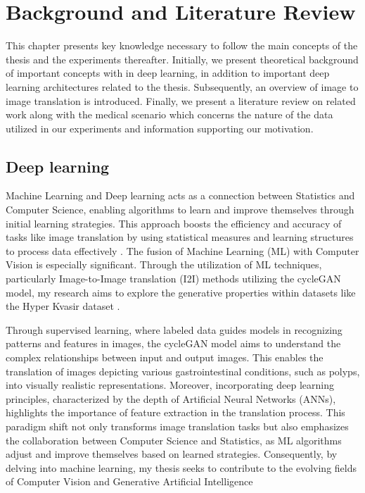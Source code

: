 \documentclass[UKenglish,12pt]{master-style}
\begin{document}
\chapter{Background and Literature Review}

This chapter presents key knowledge necessary to follow the main concepts of the thesis and the experiments thereafter. Initially, we present theoretical background of important concepts with in deep learning, in addition to important deep learning architectures related to the thesis. Subsequently, an overview of image to image translation is introduced. Finally, we present a literature review on related work along with the medical scenario which concerns the nature of the data utilized in our experiments and information supporting our motivation. 

\section{Deep learning}

Machine Learning and Deep learning acts as a connection between Statistics and Computer Science, enabling algorithms to learn and improve themselves through initial learning strategies. This approach boosts the efficiency and accuracy of tasks like image translation by using statistical measures and learning structures to process data effectively \cite{app14020496}. The fusion of Machine Learning (ML) with Computer Vision is especially significant. Through the utilization of ML techniques, particularly Image-to-Image translation (I2I) methods utilizing the cycleGAN model, my research aims to explore the generative properties within datasets like the Hyper Kvasir dataset  \cite{I2I}.

Through supervised learning, where labeled data guides models in recognizing patterns and features in images, the cycleGAN model aims to understand the complex relationships between input and output images. This enables the translation of images depicting various gastrointestinal conditions, such as polyps, into visually realistic representations. Moreover, incorporating deep learning principles, characterized by the depth of Artificial Neural Networks (ANNs), highlights the importance of feature extraction in the translation process. This paradigm shift not only transforms image translation tasks but also emphasizes the collaboration between Computer Science and Statistics, as ML algorithms adjust and improve themselves based on learned strategies. Consequently, by delving into machine learning, my thesis seeks to contribute to the evolving fields of Computer Vision and Generative Artificial Intelligence
\end{document}
